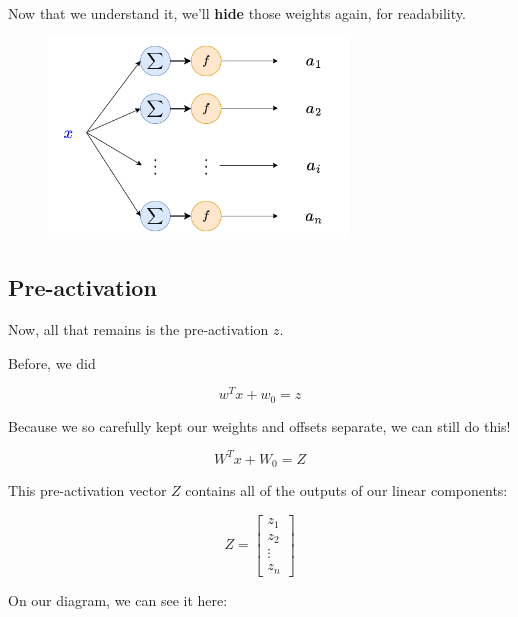         Now that we understand it, we'll \textbf{hide} those weights again, for readability.
        
        \begin{figure}[H]
            \centering
            \includegraphics[width=80mm,scale=0.4]{images/nn_images/remove_input.png}
        \end{figure}
        
    
    \subsection{Pre-activation}
    
        Now, all that remains is the pre-activation $z$.
        
        Before, we did 
        
        \begin{equation}
            w^Tx + w_0 = z
        \end{equation}
        
        Because we so carefully kept our weights and offsets separate, we can still do this!
        
        \begin{equation}
            W^Tx + W_0 = Z
        \end{equation}
        
        This pre-activation vector $Z$ contains all of the outputs of our linear components:
        
        \begin{equation}
            Z = 
            \begin{bmatrix}
              z_1 \\ z_2 \\ \vdots \\ z_n
            \end{bmatrix}
        \end{equation}
        
        On our diagram, we can see it here:
        
